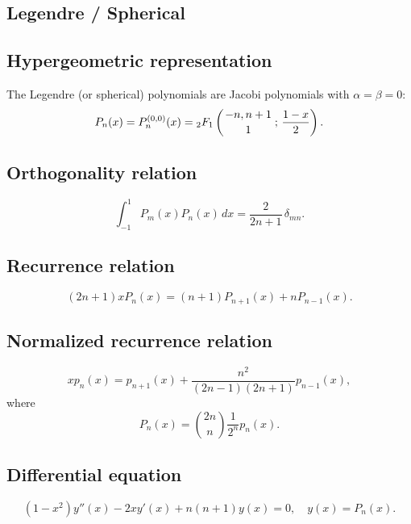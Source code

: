 \documentclass[envcountchap,graybox]{svmono}
\newcommand{\hyp}[5]{\mbox{}_{#1}{F}_{#2}
\left(\genfrac{}{}{0pt}{}{#3}{#4}\,;\,#5\right)}
\begin{document}
\subsection{Legendre / Spherical}

\par

\subsection*{Hypergeometric representation}
The Legendre (or spherical) polynomials are Jacobi polynomials with $\alpha=\beta=0$:
\begin{equation}
\label{DefLegendre}
P_n(x)=P_n^{(0,0)}(x)=\hyp{2}{1}{-n,n+1}{1}{\frac{1-x}{2}}.
\end{equation}

\subsection*{Orthogonality relation}
\begin{equation}
\label{OrtLegendre}
\int_{-1}^1P_m(x)P_n(x)\,dx=\frac{2}{2n+1}\,\delta_{mn}.
\end{equation}

\subsection*{Recurrence relation}
\begin{equation}
\label{RecLegendre}
(2n+1)xP_n(x)=(n+1)P_{n+1}(x)+nP_{n-1}(x).
\end{equation}

\subsection*{Normalized recurrence relation}
\begin{equation}
\label{NormRecLegendre}
xp_n(x)=p_{n+1}(x)+\frac{n^2}{(2n-1)(2n+1)}p_{n-1}(x),
\end{equation}
where
$$P_n(x)=\binom{2n}{n}\frac{1}{2^n}p_n(x).$$

\subsection*{Differential equation}
\begin{equation}
\label{dvLegendre}
(1-x^2)y''(x)-2xy'(x)+n(n+1)y(x)=0,\quad y(x)=P_n(x).
\end{equation}
\end{document}

